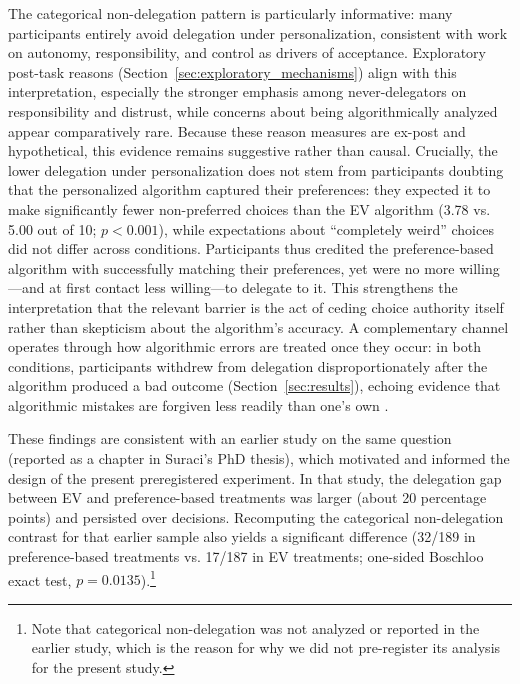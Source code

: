 \documentclass[a4paper, 12pt, fleqn]{article}
\theoremstyle{definition}
\begin{document}
The categorical non-delegation pattern is particularly informative: many participants entirely avoid delegation under personalization, consistent with work on autonomy, responsibility, and control as drivers of acceptance. Exploratory post-task reasons (Section~\ref{sec:exploratory_mechanisms}) align with this interpretation, especially the stronger emphasis among never-delegators on responsibility and distrust, while concerns about being algorithmically analyzed appear comparatively rare. Because these reason measures are ex-post and hypothetical, this evidence remains suggestive rather than causal. Crucially, the lower delegation under personalization does not stem from participants doubting that the personalized algorithm captured their preferences: they expected it to make significantly fewer non-preferred choices than the EV algorithm (3.78 vs. 5.00 out of 10; $p < 0.001$), while expectations about ``completely weird'' choices did not differ across conditions. Participants thus credited the preference-based algorithm with successfully matching their preferences, yet were no more willing---and at first contact less willing---to delegate to it. This strengthens the interpretation that the relevant barrier is the act of ceding choice authority itself rather than skepticism about the algorithm's accuracy. A complementary channel operates through how algorithmic errors are treated once they occur: in both conditions, participants withdrew from delegation disproportionately after the algorithm produced a bad outcome (Section~\ref{sec:results}), echoing evidence that algorithmic mistakes are forgiven less readily than one's own \citep{Dietvorst2018,Renier2021}.

These findings are consistent with an earlier study on the same question (reported as a chapter in Suraci's PhD thesis), which motivated and informed the design of the present preregistered experiment. In that study, the delegation gap between EV and preference-based treatments was larger (about 20 percentage points) and persisted over decisions. Recomputing the categorical non-delegation contrast for that earlier sample also yields a significant difference (32/189 in preference-based treatments vs. 17/187 in EV treatments; one-sided Boschloo exact test, $p = 0.0135$).\footnote{Note that categorical non-delegation was not analyzed or reported in the earlier study, which is the reason for why we did not pre-register its analysis for the present study.}
\end{document}
